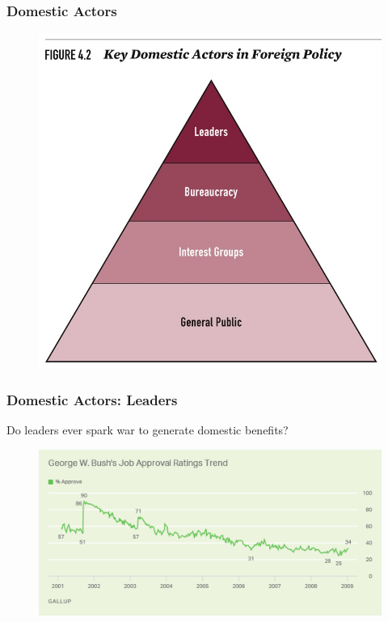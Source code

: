 \documentclass[handout]{beamer}
\begin{document}
\begin{frame} 
	\frametitle{\LARGE{Domestic Actors}}
	\begin{figure}[ht!]
		\centering
		\includegraphics[width=\textwidth,height=0.9\textheight,keepaspectratio]{Domesticactors.jpg}
	\end{figure}
\end{frame}

\begin{frame} 
	\frametitle{\LARGE{Domestic Actors: Leaders}}
 Do leaders ever spark war to generate domestic benefits?
	\begin{figure}[ht!]
	\centering
	\includegraphics[width=\textwidth,height=0.9\textheight,keepaspectratio]{Bushapproval.png}
	\end{figure}
\end{frame}
\end{document}
